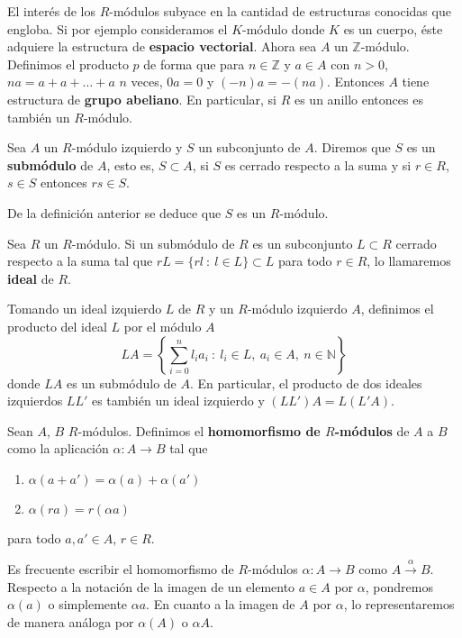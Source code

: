 \begin{ejemplo}
	El interés de los $R$-módulos subyace en la cantidad de estructuras conocidas que engloba. Si por ejemplo consideramos el $K$-módulo donde $K$ es un cuerpo, éste adquiere la estructura de \textbf{espacio vectorial}. Ahora sea $A$ un $\mathbb{Z}$-módulo. Definimos el producto $p$ de forma que para $n \in \mathbb{Z}$ y $a \in A$ con $n>0$, $na = a + a + \dots + a$ $n$ veces, $0a=0$ y $(-n)a = -(na)$. Entonces $A$ tiene estructura de \textbf{grupo abeliano}. En particular, si $R$ es un anillo entonces es también un $R$-módulo.
\end{ejemplo}

\begin{definicion}
	Sea $A$ un $R$-módulo izquierdo y $S$ un subconjunto de $A$. Diremos que $S$ es un \textbf{submódulo} de $A$, esto es, $S \subset A$, si $S$ es cerrado respecto a la suma y si $r \in R$, $s \in S$ entonces $rs \in S$.
\end{definicion}
De la definición anterior se deduce que $S$ es un $R$-módulo.
\begin{definicion} 
Sea $R$ un $R$-módulo.	Si un submódulo de $R$ es un subconjunto $L \subset R$ cerrado respecto a la suma tal que $rL = \{rl \ : \ l \in L\} \subset L$ para todo $r \in R$, lo llamaremos \textbf{ideal} de $R$.
\end{definicion}

Tomando un ideal izquierdo $L$ de $R$ y un $R$-módulo izquierdo $A$, definimos el producto del ideal $L$ por el módulo $A$
\[ LA = \left\lbrace \sum_{i=0}^n l_ia_i \ : \ l_i \in L,\ a_i \in A,\ n \in \mathbb{N} \right\rbrace \]
donde $LA$ es un submódulo de $A$. En particular, el producto de dos ideales izquierdos $LL'$ es también un ideal izquierdo y $(LL')A = L(L'A)$.

\begin{definicion}
	Sean $A$, $B$ $R$-módulos. Definimos el \textbf{homomorfismo de $R$-módulos} de $A$ a $B$ como la aplicación $\alpha: A \rightarrow B$ tal que
	\begin{enumerate}
		\item $\alpha(a+a') = \alpha(a) + \alpha(a')$
		\item $\alpha(ra) = r(\alpha a)$
	\end{enumerate}
	para todo $a,a' \in A$, $r \in R$.
\end{definicion}
Es frecuente escribir el homomorfismo de $R$-módulos $\alpha: A \rightarrow B$ como $A \xrightarrow{\alpha} B$. Respecto a la notación de la imagen de un elemento $a \in A$ por $\alpha$, pondremos $\alpha(a)$ o simplemente $\alpha a$. En cuanto a la imagen de $A$ por $\alpha$, lo representaremos de manera análoga por $\alpha(A)$ o $\alpha A$.


